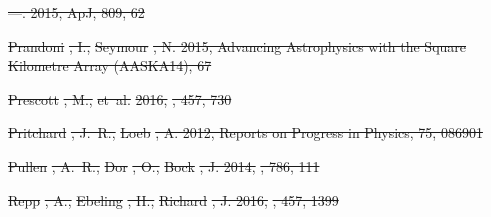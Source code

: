 \documentclass[numberedappendix]{emulateapj}
\providecommand{\DIFdel}[1]{{\protect\color{red}\sout{#1}}}                      %
\begin{document}
\DIFdel{---. 2015, ApJ, 809, 62
}%

\DIFdel{Prandoni}%
\DIFdel{, I., }%
\DIFdel{Seymour}%
\DIFdel{, N. 2015, Advancing Astrophysics with the Square
  Kilometre Array (AASKA14), 67
}%

\DIFdel{Prescott}%
\DIFdel{, M., }%
\DIFdel{et~al.}%
\DIFdel{2016, }%
\DIFdel{, 457, 730
}%

\DIFdel{Pritchard}%
\DIFdel{, J.~R., }%
\DIFdel{Loeb}%
\DIFdel{, A. 2012, Reports on Progress in Physics, 75,
  086901
}%

\DIFdel{Pullen}%
\DIFdel{, A.~R., }%
\DIFdel{Dor}%
\DIFdel{, O., }%
\DIFdel{Bock}%
\DIFdel{, J. 2014, }%
\DIFdel{, 786, 111
}%

\DIFdel{Repp}%
\DIFdel{, A., }%
\DIFdel{Ebeling}%
\DIFdel{, H., }%
\DIFdel{Richard}%
\DIFdel{, J. 2016, }%
\DIFdel{, 457, 1399
}%
\end{document}
